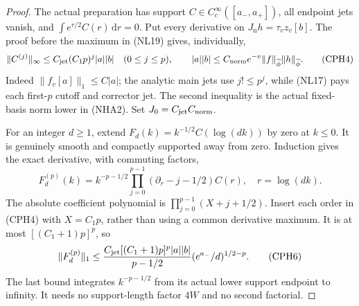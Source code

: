 \documentclass[11pt]{article}
\theoremstyle{remark}\newtheorem{remark}[theorem]{Remark}
\newcommand{\dd}{\,\mathrm d}
\begin{document}
\begin{proof}
The actual preparation has support
\(C\in C_c^\infty([a_-,a_+])\), all endpoint jets vanish,
and \(\int e^{r/2}C(r)\dd r=0\).
Put every derivative on \(J_{\mathrm n}h=\tau_vz_v[b]\).
The proof before the maximum in (NL19) gives, individually,
\[
 \|C^{(j)}\|_\infty
  \le C_{\rm jet}(C_1p)^j|a||b|\quad(0\le j\le p),\qquad
 |a||b|\le C_{\rm norm}e^{-v}
                 \|f\|_{\widetilde\phi}\|h\|_{\widetilde\phi}.
                                                               \tag{CPH4}
\]
Indeed \(\|f_v[a]\|_1\le C|a|\); the analytic main jets use
\(j!\le p^j\), while (NL17) pays each first-\(p\) cutoff and
corrector jet. The second inequality is the actual fixed-basis
norm lower in (NHA2). Set \(J_0=C_{\rm jet}C_{\rm norm}\).

For an integer \(d\ge1\), extend
\(F_d(k)=k^{-1/2}C(\log(dk))\) by zero at \(k\le0\).
It is genuinely smooth and compactly supported away from zero.
Induction gives the exact derivative, with commuting factors,
\[
 F_d^{(p)}(k)=k^{-p-1/2}
          \prod_{j=0}^{p-1}(\partial_r-j-1/2)C(r),
                         \quad r=\log(dk).                    \tag{CPH5}
\]
The absolute coefficient polynomial is
\(\prod_{j=0}^{p-1}(X+j+1/2)\). Insert each order in (CPH4)
with \(X=C_1p\), rather than using a common derivative maximum.
It is at most \([(C_1+1)p]^p\), so
\[
 \|F_d^{(p)}\|_1
 \le\frac{C_{\rm jet}[(C_1+1)p]^p|a||b|}{p-1/2}
                              (e^{a_-}/d)^{1/2-p}.            \tag{CPH6}
\]
The last bound integrates \(k^{-p-1/2}\) from its actual
lower support endpoint to infinity. It needs no support-length
factor \(4W\) and no second factorial.


\end{proof}
\end{document}
